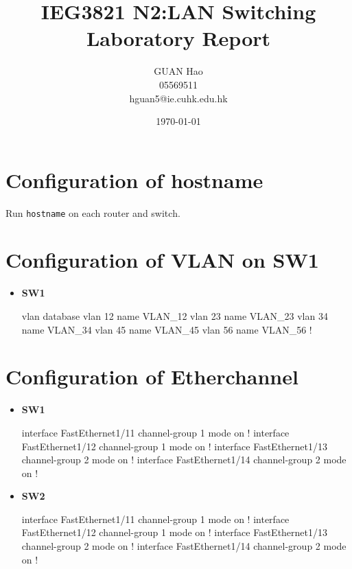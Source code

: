 \documentclass[10pt]{article}
\author{GUAN Hao\\05569511\\hguan5@ie.cuhk.edu.hk}
\title{IEG3821 N2:LAN Switching\\Laboratory Report}
\date{\today}
\begin{document}
\maketitle
\setcounter{section}{-1}
\section{Configuration of hostname}
Run {\tt hostname} on each router and switch.
\section{Configuration of VLAN on SW1}
\begin{itemize}
\item {\bf SW1}
\begin{verbatim*}
vlan database
 vlan 12 name VLAN_12
 vlan 23 name VLAN_23
 vlan 34 name VLAN_34
 vlan 45 name VLAN_45
 vlan 56 name VLAN_56
!
\end{verbatim*}
\end{itemize}
\section{Configuration of Etherchannel}
\begin{itemize}
\item {\bf SW1}
\begin{verbatim*}
interface FastEthernet1/11
 channel-group 1 mode on
!
interface FastEthernet1/12
 channel-group 1 mode on
!
interface FastEthernet1/13
 channel-group 2 mode on
!
interface FastEthernet1/14
 channel-group 2 mode on
!
\end{verbatim*}
\item {\bf SW2}
\begin{verbatim*}
interface FastEthernet1/11
 channel-group 1 mode on
!
interface FastEthernet1/12
 channel-group 1 mode on
!
interface FastEthernet1/13
 channel-group 2 mode on
!
interface FastEthernet1/14
 channel-group 2 mode on
!
\end{verbatim*}
\end{itemize}
\end{document}
